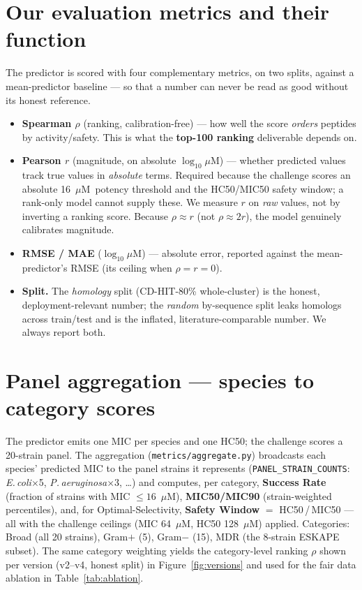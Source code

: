 \documentclass[11pt]{article}
\newcommand{\uM}{\ensuremath{\mu}M}
\newcommand{\spn}[1]{\textit{#1}}
\begin{document}
\section{Our evaluation metrics and their function}

The predictor is scored with four complementary metrics, on two splits, against a mean-predictor
baseline --- so that a number can never be read as good without its honest reference.

\begin{itemize}\itemsep2pt
  \item \textbf{Spearman $\rho$} (ranking, calibration-free) --- how well the score \emph{orders}
        peptides by activity/safety. This is what the \textbf{top-100 ranking} deliverable depends on.
  \item \textbf{Pearson $r$} (magnitude, on absolute $\log_{10}$\uM) --- whether predicted values track
        true values in \emph{absolute} terms. Required because the challenge scores an absolute
        16~\uM\ potency threshold and the HC50/MIC50 safety window; a rank-only model cannot supply
        these. We measure $r$ on \emph{raw} values, not by inverting a ranking score. Because
        $\rho\!\approx\!r$ (not $\rho\!\approx\!2r$), the model genuinely calibrates magnitude.
  \item \textbf{RMSE / MAE} ($\log_{10}$\uM) --- absolute error, reported against the mean-predictor's
        RMSE (its ceiling when $\rho\!=\!r\!=\!0$).
  \item \textbf{Split.} The \emph{homology} split (CD-HIT-80\% whole-cluster) is the honest,
        deployment-relevant number; the \emph{random} by-sequence split leaks homologs across
        train/test and is the inflated, literature-comparable number. We always report both.
\end{itemize}

\section{Panel aggregation --- species to category scores}\label{sec:agg}

The predictor emits one MIC per species and one HC50; the challenge scores a 20-strain panel. The
aggregation (\texttt{metrics/aggregate.py}) broadcasts each species' predicted MIC to the
panel strains it represents (\texttt{PANEL\_STRAIN\_COUNTS}: \spn{E.\,coli}$\times$5,
\spn{P.\,aeruginosa}$\times$3, \dots) and computes, per category, \textbf{Success Rate} (fraction of
strains with MIC $\le 16$~\uM), \textbf{MIC50/MIC90} (strain-weighted percentiles), and, for
Optimal-Selectivity, \textbf{Safety Window} $=$ HC50\,/\,MIC50 --- all with the challenge ceilings
(MIC 64~\uM, HC50 128~\uM) applied. Categories: Broad (all 20 strains), Gram$+$ (5), Gram$-$ (15),
MDR (the 8-strain ESKAPE subset). The same category weighting yields the category-level ranking
$\rho$ shown per version (v2--v4, honest split) in Figure~\ref{fig:versions} and used for the fair
data ablation in Table~\ref{tab:ablation}.
\end{document}
